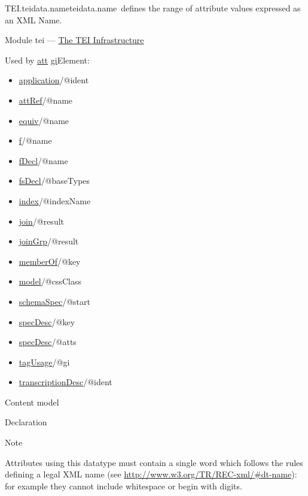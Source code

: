 \begin{reflist}
\item[]\begin{specHead}{TEI.teidata.name}{teidata.name} defines the range of attribute values expressed as an XML Name.\end{specHead} 
    \item[{Module}]
  tei — \hyperref[ST]{The TEI Infrastructure}
    \item[{Used by}]
  \hyperref[TEI.att]{att} \hyperref[TEI.gi]{gi}Element: \begin{itemize}
\item \hyperref[TEI.application]{application}/@ident
\item \hyperref[TEI.attRef]{attRef}/@name
\item \hyperref[TEI.equiv]{equiv}/@name
\item \hyperref[TEI.f]{f}/@name
\item \hyperref[TEI.fDecl]{fDecl}/@name
\item \hyperref[TEI.fsDecl]{fsDecl}/@baseTypes
\item \hyperref[TEI.index]{index}/@indexName
\item \hyperref[TEI.join]{join}/@result
\item \hyperref[TEI.joinGrp]{joinGrp}/@result
\item \hyperref[TEI.memberOf]{memberOf}/@key
\item \hyperref[TEI.model]{model}/@cssClass
\item \hyperref[TEI.schemaSpec]{schemaSpec}/@start
\item \hyperref[TEI.specDesc]{specDesc}/@key
\item \hyperref[TEI.specDesc]{specDesc}/@atts
\item \hyperref[TEI.tagUsage]{tagUsage}/@gi
\item \hyperref[TEI.transcriptionDesc]{transcriptionDesc}/@ident
\end{itemize} 
    \item[{Content model}]
    \item[{Declaration}]
    \item[{Note}]
  \par
Attributes using this datatype must contain a single word which follows the rules defining a legal XML name (see \url{http://www.w3.org/TR/REC-xml/\#dt-name}): for example they cannot include whitespace or begin with digits.
\end{reflist}  
